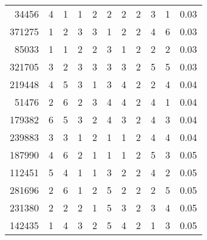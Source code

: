 \begin{table}[ht]
\begin{tabular}{rlllllllllr}
  34456 & 4 & 1 & 1 & 2 & 2 & 2 & 2 & 3 & 1 & 0.03 \\ 
  371275 & 1 & 2 & 3 & 3 & 1 & 2 & 2 & 4 & 6 & 0.03 \\ 
  85033 & 1 & 1 & 2 & 2 & 3 & 1 & 2 & 2 & 2 & 0.03 \\ 
  321705 & 3 & 2 & 3 & 3 & 3 & 3 & 2 & 5 & 5 & 0.03 \\ 
  219448 & 4 & 5 & 3 & 1 & 3 & 4 & 2 & 2 & 4 & 0.04 \\ 
  51476 & 2 & 6 & 2 & 3 & 4 & 4 & 2 & 4 & 1 & 0.04 \\ 
  179382 & 6 & 5 & 3 & 2 & 4 & 3 & 2 & 4 & 3 & 0.04 \\ 
  239883 & 3 & 3 & 1 & 2 & 1 & 1 & 2 & 4 & 4 & 0.04 \\ 
  187990 & 4 & 6 & 2 & 1 & 1 & 1 & 2 & 5 & 3 & 0.05 \\ 
  112451 & 5 & 4 & 1 & 1 & 3 & 2 & 2 & 4 & 2 & 0.05 \\ 
  281696 & 2 & 6 & 1 & 2 & 5 & 2 & 2 & 2 & 5 & 0.05 \\ 
  231380 & 2 & 2 & 2 & 1 & 5 & 3 & 2 & 3 & 4 & 0.05 \\ 
  142435 & 1 & 4 & 3 & 2 & 5 & 4 & 2 & 1 & 3 & 0.05 \\ 
   \hline
\end{tabular}
\end{table}
